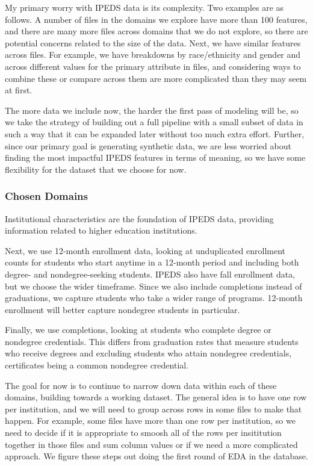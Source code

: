 \documentclass[sigconf, authorversion, nonacm]{acmart}
\begin{document}
        My primary worry with IPEDS data is its complexity. Two examples are as follows. A number of files in the domains we explore have more than 100 features, and there are many more files across domains that we do not explore, so there are potential concerns related to the size of the data. Next, we have similar features across files. For example, we have breakdowns by race/ethnicity and gender and across different values for the primary attribute in files, and considering ways to combine these or compare across them are more complicated than they may seem at first.

        The more data we include now, the harder the first pass of modeling will be, so we take the strategy of building out a full pipeline with a small subset of data in such a way that it can be expanded later without too much extra effort. Further, since our primary goal is generating synthetic data, we are less worried about finding the most impactful IPEDS features in terms of meaning, so we have some flexibility for the dataset that we choose for now.

        \subsubsection{Chosen Domains}

            Institutional characteristics are the foundation of IPEDS data, providing information related to higher education institutions.

            Next, we use 12-month enrollment data, looking at unduplicated enrollment counts for students who start anytime in a 12-month period and including both degree- and nondegree-seeking students. IPEDS also have fall enrollment data, but we choose the wider timeframe. Since we also include completions instead of graduations, we capture students who take a wider range of programs. 12-month enrollment will better capture nondegree students in particular.

            Finally, we use completions, looking at students who complete degree or nondegree credentials. This differs from graduation rates that measure students who receive degrees and excluding students who attain nondegree credentials, certificates being a common nondegree credential.





            The goal for now is to continue to narrow down data within each of these domains, building towards a working dataset. The general idea is to have one row per institution, and we will need to group across rows in some files to make that happen. For example, some files have more than one row per institution, so we need to decide if it is appropriate to smoosh all of the rows per insititution together in those files and sum column values or if we need a more complicated approach. We figure these steps out doing the first round of EDA in the database.
\end{document}
